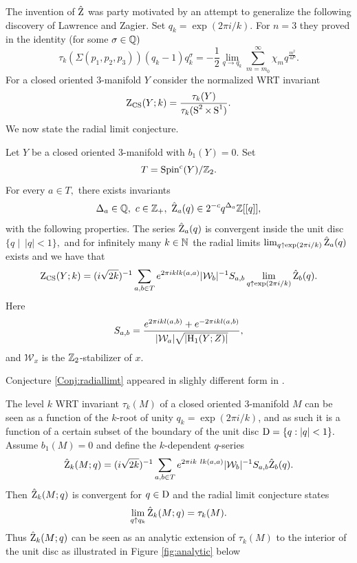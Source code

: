 The invention of $\hat{\operatorname{Z}}$ was party motivated by an attempt to generalize the following discovery of Lawrence and Zagier. Set $q_k=\exp(2\pi i/k).$ For $n=3$ they proved in \cite{LawrenceZagier} the identity (for some $\sigma \in \mathbb{Q})$  $$\tau_k\left(\Sigma(p_1,p_2,p_3)\right)(q_k-1)q_k^{\sigma}= -\frac{1}{2} \lim_{q \rightarrow q_k} \sum_{m=m_0}^{\infty} \chi_mq^{\frac{m^2}{4P}}.$$
For a closed oriented $3$-manifold $Y$ consider the normalized WRT invariant 
\begin{equation}
\operatorname{Z}_{\operatorname{CS}}(Y;k)= \frac{\tau_k(Y)}{\tau_k(\operatorname{S}^2 \times \operatorname{S}^1)}.
\end{equation} 
We now state the radial limit conjecture.
\begin{conjecture}  \label{Conj:radiallimt} Let $Y$ be a closed oriented $3$-manifold with $b_1(Y)=0.$ Set $$T=\operatorname{Spin^c}(Y)/\mathbb{Z}_2.$$ For every $a\in T,$ there exists invariants
	$$\Delta_a \in \Q, \ c \in \Z_+, \ \hat{\z}_a(q) \in 2^{-c}q^{\Delta_a}\Z[[q]],$$ with the following properties. The series $\hat{\operatorname{Z}}_a(q)$ is convergent inside the unit disc $\{q\mid \  \lvert q \rvert <1\},$ and for infinitely many $k \in \mathbb{N}$ the radial limits $\lim_{q \uparrow \exp(2\pi i/k)} \hat{\operatorname{Z}}_a(q)$ exists and we have that
	\begin{equation}
	\operatorname{Z}_{\operatorname{CS}}(Y;k)=(i\sqrt{2k})^{-1} \sum_{a,b\in T} e^{2\pi i k lk(a,a)} \lvert \mathcal{W}_{b} \rvert^{-1} S_{a,b} \lim_{q\uparrow \exp(2\pi i/k)} \hat{\operatorname{Z}}_b(q).
	\end{equation}
	Here $$S_{a,b}=\frac{e^{2\pi i kl(a,b)}+e^{-2\pi i kl(a,b)}}{\lvert \mathcal{W}_{a} \rvert \sqrt{\lvert \operatorname{H}_1(Y;Z)\rvert}},$$
	and $\mathcal{W}_x$ is the $\mathbb{Z}_2$-stabilizer of $x.$
\end{conjecture}
\begin{remark} Conjecture \ref{Conj:radiallimt} appeared in slighly different form in \cite{ChengChunFerrariGukovHarrison18, GukovPeiPutrovVada18,GukovMarinoPutrov}.
	\end{remark}  The level $k$ WRT invariant $\tau_k(M)$ of a closed oriented $3$-manifold $M$ can be seen as a function of the $k$-root of unity  $q_k=\exp(2\pi i/k)$, and as such it is a function of a certain subset of the boundary of the unit disc $\operatorname{D}=\{q : \lvert q \rvert <1\}.$ Assume $b_1(M)=0$ and define the $k$-dependent $q$-series
\begin{equation}
\hat{\operatorname{Z}}_k(M;q)=(i\sqrt{2k})^{-1} \sum_{a,b\in T} e^{2\pi i k\  lk(a,a)} \lvert \mathcal{W}_{b} \rvert^{-1} S_{a,b}\hat{\operatorname{Z}}_b(q).
\end{equation}
Then $\hat{\operatorname{Z}}_k(M;q)$ is convergent for $q \in \operatorname{D}$ and the radial limit conjecture states
$$\lim_{q \uparrow q_k} \hat{\operatorname{Z}}_k(M;q)=\tau_k(M).$$ Thus $\hat{\operatorname{Z}}_k(M;q)$ can be seen as an analytic extension of $\tau_k(M)$ to the interior of the unit disc as illustrated in Figure \ref{fig:analytic} below

